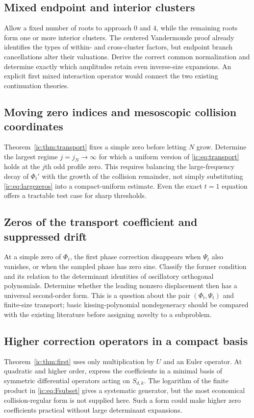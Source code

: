 \documentclass[11pt,a4paper]{article}
\numberwithin{equation}{section}
\theoremstyle{definition}
\theoremstyle{remark}
\begin{document}
\subsection{Mixed endpoint and interior clusters}\label{ic:x:mixed}
Allow a fixed number of roots to approach $0$ and $4$, while the
remaining roots form one or more interior clusters. The centered
Vandermonde proof already identifies the types of within- and
cross-cluster factors, but endpoint branch cancellations alter their
valuations. Derive the correct common normalization and determine
exactly which amplitudes retain even inverse-size expansions. An
explicit first mixed interaction operator would connect the two
existing continuation theories.

\subsection{Moving zero indices and mesoscopic collision coordinates}
Theorem~\ref{ic:thm:transport} fixes a simple zero before letting $N$ grow.
Determine the largest regime $j=j_N\to\infty$ for which a uniform
version of \eqref{ic:eq:transport} holds at the $j$th odd profile zero.
This requires balancing the large-frequency decay of $\Phi_t'$ with
the growth of the collision remainder, not simply substituting
\eqref{ic:eq:largezeros} into a compact-uniform estimate. Even the exact
$t=1$ equation offers a tractable test case for sharp thresholds.

\subsection{Zeros of the transport coefficient and suppressed drift}
At a simple zero of $\Phi_t$, the first phase correction disappears
when $\Psi_t$ also vanishes, or when the sampled phase has zero sine.
Classify the former condition and its relation to the determinant
identities of oscillatory orthogonal polynomials. Determine whether the
leading nonzero displacement then has a universal second-order form.
This is a question about the pair $(\Phi_t,\Psi_t)$ and finite-size
transport; basic kissing-polynomial nondegeneracy should be compared
with the existing literature before assigning novelty to a subproblem.

\subsection{Higher correction operators in a compact basis}
Theorem~\ref{ic:thm:first} uses only multiplication by $U$ and an Euler
operator. At quadratic and higher order, express the coefficients in a
minimal basis of symmetric differential operators acting on $S_{d,k}$.
The logarithm of the finite product in \eqref{ic:eq:Fsubset} gives a
systematic generator, but the most economical collision-regular form is
not supplied here. Such a form could make higher zero coefficients
practical without large determinant expansions.
\end{document}
